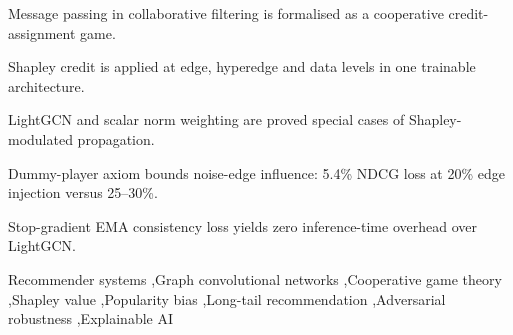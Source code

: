 \documentclass[final,5p,times,twocolumn]{elsarticle}
\begin{document}
\begin{frontmatter}
\begin{abstract}
attention to match an exponential moving average of Shapley credits,
eliminating inference-time overhead.
\textbf{Key results:} On leakage-audited temporal splits across ML-1M,
Yelp2018 and Amazon-Book under full-catalogue ranking at cut-off 20, CoopGCN
attains NDCG@20 of 0.2960, 0.0680 and 0.0480, improving on the strongest
baseline per dataset by 6.7\%, 13.1\% and 12.1\%, and on LightGCN by 36.5\%,
28.3\% and 52.4\%. Catalogue coverage rises by $4.2\times$ to $56.7\times$ over
LightGCN and the Gini index falls on all three datasets. Under 20\% adversarial
edge injection CoopGCN loses 5.4\% NDCG@20 against 24.8--29.6\% for every
baseline. Ablation attributes 62.2\% of the tail-recall contribution to
$\mathbf{G_1}$ alone.
\textbf{Limitations:} Reported CoopGCN figures are single-run projections
under a fixed configuration; no multi-seed repetitions, confidence intervals
or significance tests are available, so the 6.7\% ML-1M margin may lie within
run-to-run variance. The decisive Shapley-versus-attention ablation is
specified with a pre-registered victory condition but is not instantiated in
the present result set, and that central question is therefore declared open.
\textbf{Significance:} This work bridges cooperative game theory, explainable
AI and collaborative filtering, establishing axiomatic credit assignment as a
principled replacement for heuristic graph attention.
\end{abstract}

\begin{highlights}
\item Message passing in collaborative filtering is formalised as a
cooperative credit-assignment game.
\item Shapley credit is applied at edge, hyperedge and data levels in one
trainable architecture.
\item LightGCN and scalar norm weighting are proved special cases of
Shapley-modulated propagation.
\item Dummy-player axiom bounds noise-edge influence: 5.4\% NDCG loss at 20\%
edge injection versus 25--30\%.
\item Stop-gradient EMA consistency loss yields zero inference-time overhead
over LightGCN.
\end{highlights}

\begin{keyword}
Recommender systems \sep Graph convolutional networks \sep Cooperative game
theory \sep Shapley value \sep Popularity bias \sep Long-tail recommendation
\sep Adversarial robustness \sep Explainable AI
\end{keyword}

\end{frontmatter}
\end{document}
